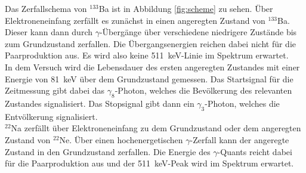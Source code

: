 Das Zerfallschema von $^{133}$Ba ist in Abbildung \ref{fig:scheme} zu sehen. Über Elektroneneinfang zerfällt es zunächst in einen angeregten Zustand von $^{133}$Ba. Dieser kann dann durch $\gamma$-Übergänge über verschiedene niedrigere Zustände bis zum Grundzustand zerfallen. Die Übergangsenergien reichen dabei nicht für die Paarproduktion aus. Es wird also keine \SI{511}{\kilo\electronvolt}-Linie im Spektrum erwartet. \\

In dem Versuch wird die Lebensdauer des ersten angeregten Zustandes mit einer Energie von \SI{81}{\kilo\electronvolt} über dem Grundzustand gemessen. Das Startsignal für die Zeitmessung gibt dabei das $\gamma_8$-Photon, welches die Bevölkerung des relevanten Zustandes signalisiert. Das Stopsignal gibt dann ein $\gamma_3$-Photon, welches die Entvölkerung signalisiert. \\

$^{22}$Na zerfällt über Elektroneneinfang zu dem Grundzustand oder dem angeregten Zustand von $^{22}$Ne. Über einen hochenergetischen $\gamma$-Zerfall kann der angeregte Zustand in den Grundzustand zerfallen. Die Energie des $\gamma$-Quants reicht dabei für die Paarproduktion aus und der \SI{511}{\kilo\electronvolt}-Peak wird im Spektrum erwartet.
